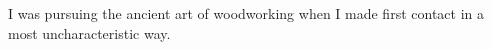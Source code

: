 I was pursuing the ancient art of woodworking when I made first contact
in a most uncharacteristic way. 

